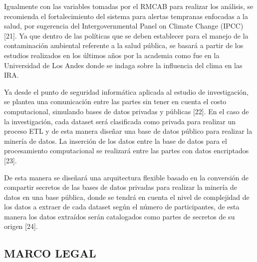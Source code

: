 \documentclass[a4paper, 12pt, oneside]{article}
\theoremstyle{definition}
\theoremstyle{remark}
\begin{document}
Igualmente con las variables tomadas por el RMCAB para realizar los análisis, se recomienda el fortalecimiento del sistema para alertas tempranas enfocadas a la salud, por sugerencia del Intergovernmental Panel on Climate Change (IPCC) [21]. Ya que dentro de las políticas que se deben establecer para el manejo de la contaminación ambiental referente a la salud pública, se basará a partir de los estudios realizados en los últimos años por la academia como fue en la Universidad de Los Andes donde se indaga sobre la influencia del clima en las IRA.

Ya desde el punto de seguridad informática aplicada al estudio de investigación, se plantea una comunicación entre las partes sin tener en cuenta el costo computacional, simulando bases de datos privadas y públicas [22]. En el caso de la investigación, cada dataset será clasificada como privada para realizar un proceso ETL y de esta manera diseñar una base de datos público para realizar la minería de datos. La inserción de los datos entre la base de datos para el procesamiento computacional se realizará entre las partes con datos encriptados [23].

De esta manera se diseñará una arquitectura flexible basado en la conversión de compartir secretos de las bases de datos privadas para realizar la minería de datos en una base pública, donde se tendrá en cuenta el nivel de complejidad de los datos a extraer de cada dataset según el número de participantes, de esta manera los datos extraídos serán catalogados como partes de secretos de su origen [24].

\subsection{MARCO LEGAL}
\end{document}
